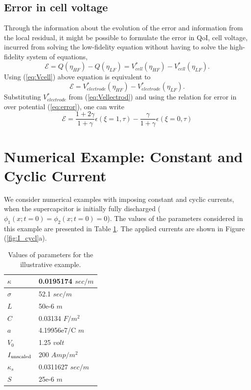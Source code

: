 \documentclass[]{article}
\begin{document}
\subsection{Error in cell voltage}
Through the information about the evolution of the error and information from the local residual, it might be possible to formulate the error in QoI, cell voltage, incurred from solving the low-fidelity equation without having to solve the high-fidelity system of equations,
%
\begin{equation}
\mathcal{E} = Q(\eta_{HF}) - Q(\eta_{LF}) = V^*_{cell}(\eta_{HF}) - V^*_{cell}(\eta_{LF}).
\end{equation}
%
Using (\ref{eq:Vcell}) above equation is equivalent to
%
\begin{equation}\label{eq:error_V_exact}
\mathcal{E} =  V^*_{electrode}(\eta_{HF}) - V^*_{electrode}(\eta_{LF}).
\end{equation}
%
Substituting $V^*_{electrode}$ from (\ref{eq:Vellectrod}) and using the relation for error in over potential (\ref{eq:error}), one can write 
%
\begin{equation}\label{eq:error_V_eta}
\mathcal{E} =  \frac{1+2\gamma}{1+\gamma}\epsilon(\xi=1,\tau) - \frac{\gamma}{1+\gamma}\epsilon(\xi=0,\tau)
\end{equation}
%




\section{Numerical Example: Constant and Cyclic Current }

 We consider numerical examples with imposing constant and cyclic currents, when the supercapcitor is initially fully discharged ($\phi_1(x;t=0) = \phi_2(x;t=0)=0$).
%
The values of the parameters considered in this example are presented in Table \ref{table:example}. The applied currents are shown in Figure (\ref{fig:I_cycl}a). 

\begin{table}[h]
\centering
\caption{Values of parameters for the illustrative example.}
\label{table:example}
\begin{tabular}{|l|l|}
\hline
$\kappa$ & 0.0195174 $sec/m$\\ \hline
$\sigma$ & 52.1  $sec/m$\\ \hline
$L$         & 50e-6  $m$\\ \hline
$C$         & 0.03134  $ F/m^2$\\ \hline
$a$         & 4.19956e7/C   $m$\\ \hline
$V_0$      & 1.25   $volt$\\ \hline
$I_{\rm unscaled}$ & 200  $Amp/m^2$\\ \hline
$\kappa_s$ & 0.0311627 $sec/m$\\ \hline
$S$         & 25e-6  $m$\\ \hline
\end{tabular}
\end{table}
\end{document}
